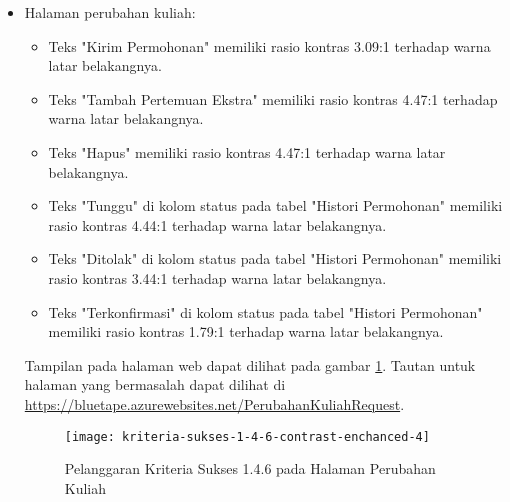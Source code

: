 \begin{itemize}
    \item Halaman perubahan kuliah: 
    \begin{itemize}
        \item Teks "Kirim Permohonan" memiliki rasio kontras 3.09:1 terhadap warna latar belakangnya.
        \item Teks "Tambah Pertemuan Ekstra" memiliki rasio kontras 4.47:1 terhadap warna latar belakangnya.
        \item Teks "Hapus" memiliki rasio kontras 4.47:1 terhadap warna latar belakangnya. 
        \item Teks "Tunggu" di kolom status pada tabel "Histori Permohonan" memiliki rasio kontras 4.44:1 terhadap warna latar belakangnya.
        \item Teks "Ditolak" di kolom status pada tabel "Histori Permohonan" memiliki rasio kontras 3.44:1 terhadap warna latar belakangnya.
        \item Teks "Terkonfirmasi" di kolom status pada tabel "Histori Permohonan" memiliki rasio kontras 1.79:1 terhadap warna latar belakangnya.
    \end{itemize}
    Tampilan pada halaman web dapat dilihat pada gambar \ref{fig:1.4.6_contrast_enchanced_4}. Tautan untuk halaman yang bermasalah dapat dilihat di \url{https://bluetape.azurewebsites.net/PerubahanKuliahRequest}.
    \begin{figure}[H]
        \centering  
        \texttt{[image: kriteria-sukses-1-4-6-contrast-enchanced-4]}  
        \caption[Pelanggaran Kriteria Sukses 1.4.6 pada Halaman Perubahan Kuliah]{Pelanggaran Kriteria Sukses 1.4.6 pada Halaman Perubahan Kuliah}
        \label{fig:1.4.6_contrast_enchanced_4}  
    \end{figure} 
    

\end{itemize}
